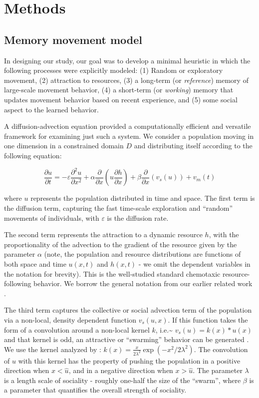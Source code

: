 \documentclass[12pt]{article}
\begin{document}
\section{Methods}

\subsection{Memory movement model}

In designing our study, our goal was to develop a minimal heuristic in which the following processes were explicitly modeled: (1) Random or exploratory movement, (2) attraction to resources, (3) a long-term (or \emph{reference}) memory of large-scale movement behavior, (4) a short-term (or \emph{working}) memory that updates movement behavior based on recent experience, and (5) some social aspect to the learned behavior.

A diffusion-advection equation provided a computationally efficient and versatile framework for examining just such a system. We consider a population moving in one dimension in a constrained domain $D$ and distributing itself according to the following equation:

\begin{equation}\label{eq_mainmodel}
{\frac{\partial u}{\partial t}} = -\varepsilon {\frac{\partial^2 u}{\partial x^2}} + 
\alpha \frac{\partial}{\partial x}\left(u \frac{\partial h}{\partial x}\right) + 
\beta \frac{\partial}{\partial x}\left(v_s(u)\right) + 
v_m(t)
\end{equation}

\noindent where $u$ represents the population distributed in time and space. The first term is the diffusion term, capturing the fast time-scale exploration and ``random'' movements of individuals, with $\varepsilon$ is the diffusion rate.

The second term represents the attraction to a dynamic resource $h$, with the proportionality of the advection to the gradient of the resource given by the parameter $\alpha$ (note, the population and resource distributions are functions of both space and time $u(x,t)$ and $h(x,t)$ - we omit the dependent variables in the notation for brevity). This is the well-studied standard chemotaxic resource-following behavior. We borrow the general notation from our earlier related work \citep{Fagan2017, Fagan2019}.

The third term captures the collective or social advection term of the population via a non-local, density dependent function $v_s(u,x)$. If this function takes the form of a convolution around a non-local kernel $k$, i.e.\textasciitilde{} $v_s(u) = k(x) * u(x)$ and that kernel is odd, an attractive or ``swarming'' behavior can be generated \citep{Mogilner1999}. We use the kernel analyzed by \citet{Mogilner1999}: $k(x) = \frac{x}{2\lambda^2} \exp(-x^2/2\lambda^2).$ The convolution of $u$ with this kernel has the property of pushing the population in a positive direction when $x < \widehat{u}$, and in a negative direction when $x > \widehat{u}$. The parameter $\lambda$ is a length scale of sociality - roughly one-half the size of the ``swarm'', where $\beta$ is a parameter that quantifies the overall strength of sociality.
\end{document}

